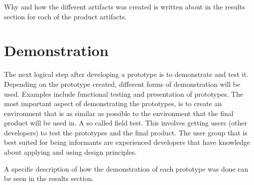 \documentclass{report}
\begin{document}
Why and how the different artifacts was created is written about in the results section for each of the product artifacts.

\section{Demonstration}

The next logical step after developing a prototype is to demonstrate and test it. Depending on the prototype created, different forms of demonstration will be used. Examples include functional testing and presentation of prototypes. The most important aspect of demonstrating the prototypes, is to create an environment that is as similar as possible to the environment that the final product will be used in. A so called field test. This involves getting users (other developers) to test the prototypes and the final product. The user group that is best suited for being informants are experienced developers that have knowledge about applying and using design principles.



A specific description of how the demonstration of each prototype was done can be seen in the results section.

 
\end{document}
